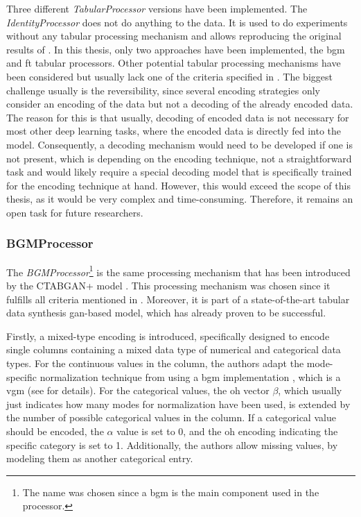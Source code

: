 Three different \textit{TabularProcessor} versions have been implemented.
The \textit{IdentityProcessor} does not do anything to the data.
It is used to do experiments without any tabular processing mechanism and allows reproducing the original results of \cite{kotelnikov2022TabDDPMModellingTabular}.
In this thesis, only two approaches have been implemented, the \gls{bgm} and \gls{ft} tabular processors.
Other potential tabular processing mechanisms have been considered but usually lack one of the criteria specified in .
The biggest challenge usually is the reversibility, since several encoding strategies only consider an encoding of the data but not a decoding of the already encoded data.
The reason for this is that usually, decoding of encoded data is not necessary for most other deep learning tasks, where the encoded data is directly fed into the \gls{model}.
Consequently, a decoding mechanism would need to be developed if one is not present, which is depending on the encoding technique, not a straightforward task and would likely require a special decoding \gls{model} that is specifically trained for the encoding technique at hand.
However, this would exceed the scope of this thesis, as it would be very complex and time-consuming.
Therefore, it remains an open task for future researchers.

\subsubsection{BGMProcessor}
\label{ch:BGMProcessor}

The \textit{BGMProcessor}\footnote{The name was chosen since a \acrfull{bgm} is the main component used in the processor.} is the same processing mechanism that has been introduced by the CTABGAN+ \gls{model} \cite{zhao2022CTABGANEnhancingTabular}.
This processing mechanism was chosen since it fulfills all criteria mentioned in .
Moreover, it is part of a state-of-the-art tabular data synthesis \gls{gan}-based \gls{model}, which has already proven to be successful.

Firstly, a mixed-type encoding is introduced, specifically designed to encode single columns containing a mixed data type of numerical and categorical data types.
For the continuous values in the column, the authors adapt the mode-specific normalization technique from \cite{xu2019ModelingTabularData} using a \gls{bgm} implementation \cite{scikit-learndevelopers2023BayesianGaussianMixture}, which is a \gls{vgm} (see  for details).
For the categorical values, the \gls{oh} vector $\beta$, which usually just indicates how many modes for normalization have been used, is extended by the number of possible categorical values in the column.
If a categorical value should be encoded, the $\alpha$ value is set to 0, and the \gls{oh} encoding indicating the specific category is set to 1.
Additionally, the authors allow missing values, by modeling them as another categorical entry.

